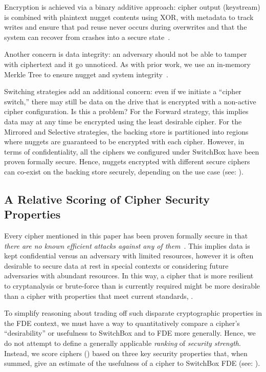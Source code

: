 Encryption is achieved via a binary additive approach: cipher output (keystream)
is combined with plaintext nugget contents using XOR, with metadata to track
writes and ensure that pad reuse never occurs during overwrites and that the
system can recover from crashes into a secure state~\cite{StrongBox}.

Another concern is data integrity: an adversary should not be able to tamper
with ciphertext and it go unnoticed. As with prior work, we use an in-memory
Merkle Tree to ensure nugget and system integrity~\cite{StrongBox}.

Switching strategies add an additional concern: even if we initiate a ``cipher
switch,'' there may still be data on the drive that is encrypted with a
non-active cipher configuration. Is this a problem? For the Forward strategy,
this implies data may at any time be encrypted using the least desirable cipher.
For the Mirrored and Selective strategies, the backing store is partitioned into
regions where nuggets are guaranteed to be encrypted with each cipher. However,
in terms of confidentiality, all the ciphers we configured under SwitchBox have
been proven formally secure. Hence, nuggets encrypted with different secure
ciphers can co-exist on the backing store securely, depending on the use case
(see: ).

\subsection{A Relative Scoring of Cipher Security Properties}

Every cipher mentioned in this paper has been proven formally secure in that
\emph{there are no known efficient attacks against any of them}~\cite{All,
Ciphers, Again}. This implies data is kept confidential versus an adversary with
limited resources, however it is often desirable to secure data at rest in
special contexts or considering future adversaries with abundant resources. 
In this way, a cipher that is more resilient to cryptanalysis or
brute-force than is currently required might be more desirable than a cipher
with properties that meet current standards, .

To simplify reasoning about trading off such disparate cryptographic properties
in the FDE context, we must have a way to quantitatively compare a cipher's
``desirability'' or usefulness to SwitchBox and to FDE more generally. Hence, we
do not attempt to define a generally applicable \textit{ranking} of
\emph{security strength}. Instead, we score ciphers
() based on three key security properties
that, when summed, give an estimate of the usefulness of a cipher to SwitchBox
FDE (see: ).

